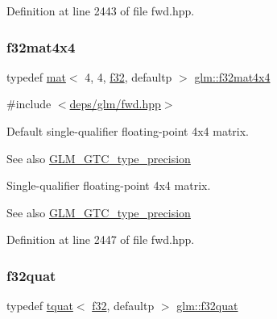 Definition at line 2443 of file fwd.\+hpp.

\mbox{\label{group__gtc__type__precision_ga2ba95a5c37eef05b26ac10e03daa5c84}} 
\subsubsection{\texorpdfstring{f32mat4x4}{f32mat4x4}}
{\footnotesize\ttfamily typedef \hyperlink{structglm_1_1mat}{mat}$<$ 4, 4, \hyperlink{group__gtc__type__precision_ga0ec999b57f5330d9021256e96038df04}{f32}, defaultp $>$ \hyperlink{group__gtc__type__precision_ga2ba95a5c37eef05b26ac10e03daa5c84}{glm\+::f32mat4x4}}



{\ttfamily \#include $<$\hyperlink{fwd_8hpp}{deps/glm/fwd.\+hpp}$>$}

Default single-\/qualifier floating-\/point 4x4 matrix. \begin{DoxySeeAlso}{See also}
\hyperlink{group__gtc__type__precision}{G\+L\+M\+\_\+\+G\+T\+C\+\_\+type\+\_\+precision}
\end{DoxySeeAlso}
Single-\/qualifier floating-\/point 4x4 matrix. \begin{DoxySeeAlso}{See also}
\hyperlink{group__gtc__type__precision}{G\+L\+M\+\_\+\+G\+T\+C\+\_\+type\+\_\+precision} 
\end{DoxySeeAlso}


Definition at line 2447 of file fwd.\+hpp.

\mbox{\label{group__gtc__type__precision_gac59c4d798396552e4bbb866b3d8a2f18}} 
\subsubsection{\texorpdfstring{f32quat}{f32quat}}
{\footnotesize\ttfamily typedef \hyperlink{structglm_1_1tquat}{tquat}$<$ \hyperlink{group__gtc__type__precision_ga0ec999b57f5330d9021256e96038df04}{f32}, defaultp $>$ \hyperlink{group__gtc__type__precision_gac59c4d798396552e4bbb866b3d8a2f18}{glm\+::f32quat}}



